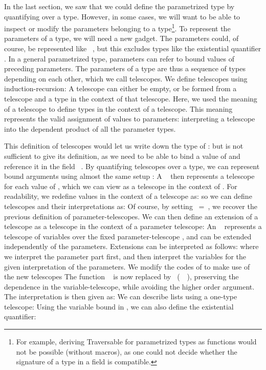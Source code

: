 In the last section, we saw that we could define the parametrized type  by quantifying over a type. However, in some cases, we will want to be able to inspect or modify the parameters belonging to a type\footnote{For example, deriving Traversable for parametrized types as functions would not be possible (without macros), as one could not decide whether the signature of a type in a field is compatible.}. To represent the parameters of a type, we will need a new gadget. The parameters could, of course, be represented like \ , but this excludes types like the existential quantifier . In a general parametrized type, parameters can refer to bound values of preceding parameters. The parameters of a type are thus a sequence of types depending on each other, which we call telescopes. We define telescopes using induction-recursion:
A telescope can either be empty, or be formed from a telescope and a type in the context of that telescope. Here, we used the meaning of a telescope  to define types in the context of a telescope. This meaning represents the valid assignment of values to parameters:
interpreting a telescope into the dependent product of all the parameter types.

This definition of telescopes would let us write down the type of :
but is not sufficient to give its definition, as we need to be able to bind a value  of  and reference it in the field \ . By quantifying telescopes over a type, we can represent bound arguments using almost the same setup \cite{practgen}:
A \  then represents a telescope for each value of , which we can view as a telescope in the context of . For readability, we redefine values in the context of a telescope as:
so we can define telescopes and their interpretations as:
Of course, by setting \ =\ , we recover the previous definition of parameter-telescopes. We can then define an extension of a telescope as a telescope in the context of a parameter telescope:
An \  represents a telescope of variables over the fixed parameter-telescope , and can be extended independently of the parameters. Extensions can be interpreted as follows:
where we interpret the parameter part first, and then interpret the variables for the given interpretation of the parameters.
We modify the codes of  to make use of the new telescopes
The function \  is now replaced by \ (\ \ ), preserving the dependence in the variable-telescope, while avoiding the higher order argument. The interpretation is then given as:
We can describe lists using a one-type telescope:
Using the variable bound in , we can also define the existential quantifier:


